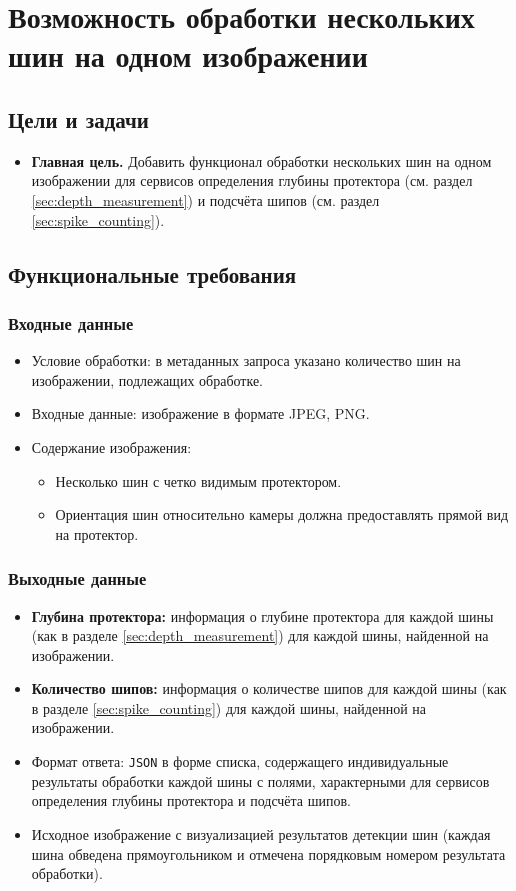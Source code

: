 \documentclass[12pt]{article}
\begin{document}
\section{Возможность обработки нескольких шин на одном изображении}
\subsection{Цели и задачи}
\begin{itemize}
	\item \textbf{Главная цель.} Добавить функционал обработки нескольких шин на одном изображении для сервисов определения глубины протектора (см. раздел \ref{sec:depth_measurement}) и подсчёта шипов (см. раздел \ref{sec:spike_counting}).
\end{itemize}

\subsection{Функциональные требования}

\subsubsection{Входные данные}
\begin{itemize}
	\item Условие обработки: в метаданных запроса указано количество шин на изображении, подлежащих обработке.
	\item Входные данные: изображение в формате JPEG, PNG.
	\item Содержание изображения:
	      \begin{itemize}
		      \item Несколько шин с четко видимым протектором.
		      \item Ориентация шин относительно камеры должна предоставлять прямой вид на протектор.
	      \end{itemize}
\end{itemize}

\subsubsection{Выходные данные}
\begin{itemize}
	\item \textbf{Глубина протектора:} информация о глубине протектора для каждой шины (как в разделе \ref{sec:depth_measurement}) для каждой шины, найденной на изображении.
	\item \textbf{Количество шипов:} информация о количестве шипов для каждой шины (как в разделе \ref{sec:spike_counting}) для каждой шины, найденной на изображении.
	\item Формат ответа: \texttt{JSON} в форме списка, содержащего индивидуальные результаты обработки каждой шины с полями, характерными для сервисов определения глубины протектора и подсчёта шипов.
	\item Исходное изображение с визуализацией результатов детекции шин (каждая шина обведена прямоугольником и отмечена порядковым номером результата обработки).
\end{itemize}
\end{document}

